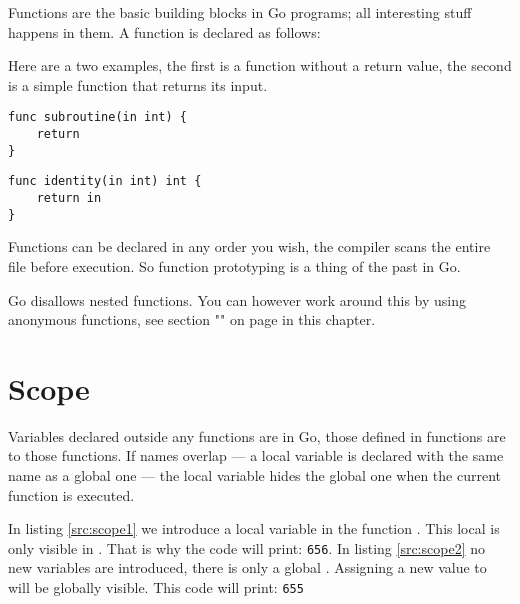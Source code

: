 
\noindent{}Functions are the basic building blocks in Go programs; all interesting
stuff happens in them. A function is declared as follows:

\showremarks
Here are a two examples, the first is a function without a return value,
the second is a simple function that returns its input.
\begin{lstlisting}
func subroutine(in int) {
    return
}
\end{lstlisting}
\begin{lstlisting}
func identity(in int) int {
    return in
}
\end{lstlisting}
Functions can be declared in any order you wish, the compiler scans the
entire file before execution. So function prototyping is a thing of the
past in Go.

Go disallows nested functions.
You can however
work around this by using anonymous functions, see section
"" on page \pageref{sec:functions as values} 
in this chapter.


\section{Scope}
Variables declared outside any functions are  in Go, those
defined in functions are  to those functions. If names overlap --- a
local variable is declared with the same name as a global one --- the
local variable hides the global one when the current function is
executed.

\begin{minipage}{.5\textwidth}

\hfill
\vfill
\end{minipage}
\hfill
\begin{minipage}{.5\textwidth}

\hfill
\vfill
\end{minipage}

In listing \ref{src:scope1} we introduce a local variable 
in the function .
This local  is only visible in . That is
why the code will print: \texttt{656}.
In listing \ref{src:scope2} no new variables are introduced, there
is only a global .
Assigning a new value to will be globally visible. This code will
print: \texttt{655}

